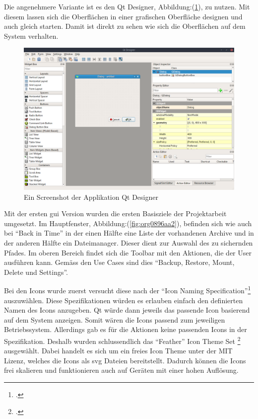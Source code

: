 Die angenehmere Variante ist es den Qt Designer, Abbildung:(\ref{fig:org81e712c}),
zu nutzen. Mit diesem lassen sich die Oberflächen in einer grafischen
Oberfläche designen und auch gleich starten. Damit ist direkt zu sehen wie sich
die Oberflächen auf dem System verhalten.

\begin{figure}[htbp]
\centering
\includegraphics[width=.9\linewidth]{pictures/qt_designer.png}
\caption{\label{fig:org81e712c}
Ein Screenshot der Applikation Qt Designer}
\end{figure}
Mit der ersten \gls{gui} Version wurden die ersten Basisziele der Projektarbeit
umgesetzt. Im Hauptfenster, Abbildung:(\ref{fig:org0896aa2}), befinden sich wie
auch bei "`Back in Time"' in der einen Hälfte eine Liste der vorhandenen Archive
und in der anderen Hälfte ein Dateimanager. Dieser dient zur Auswahl des zu
sichernden Pfades. Im oberen Bereich findet sich die Toolbar mit den Aktionen,
die der User ausführen kann. Gemäss den Use Cases sind dies "`Backup,
Restore, Mount, Delete und Settings"'.
\pagebreak

Bei den Icons wurde zuerst versucht diese nach der "`Icon Naming
Specification"'\footcite{iconnamespec} auszuwählen. Diese Spezifikationen würden
es erlauben einfach den definierten Namen des Icons anzugeben. Qt würde dann
jeweils das passende Icon basierend auf dem System anzeigen. Somit wären die
Icons passend zum jeweiligen Betriebssystem. Allerdings gab es für die Aktionen
keine passenden Icons in der Spezifikation. Deshalb wurden schlussendlich das
"`Feather"' Icon Theme Set \footcite{feathericons} ausgewählt. Dabei handelt es
sich um ein freies Icon Theme unter der MIT Lizenz, welches die Icons als \gls{svg}
Dateien bereitstellt. Dadurch können die Icons frei skalieren und
funktionieren auch auf Geräten mit einer hohen Auflösung.

